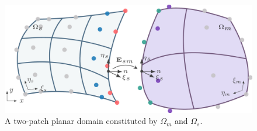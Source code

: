 \documentclass[preprint,12pt]{elsarticle}
\begin{document}
\begin{figure}
    \centering
    \includegraphics[width=\linewidth]{two_planar_patches}
    \caption{A two-patch planar domain constituted by $\Omega_m$ and $\Omega_s$.}\label{fig:two_planar_patches}
\end{figure}
\end{document}
